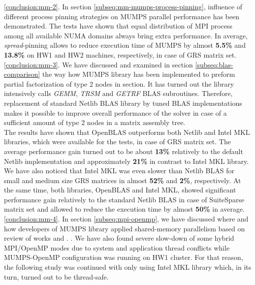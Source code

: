 \ref{conclusion:mm-2}. In section \ref{subseq:mm-mumps-process-pinning}, influence of different process pinning strategies on MUMPS parallel performance has been demonstrated. The tests have shown that equal distribution of MPI process among all available NUMA domains always bring extra performance. In average, \textit{spread}-pinning allows to reduce execution time of MUMPS by almost \textbf{5.5\%} and \textbf{13.8\%} on HW1 and HW2 machines, respectively, in case of GRS matrix set.\\


\ref{conclusion:mm-3}. 
We have discussed and examined in section \ref{subseq:blas-comparison} the way how MUMPS library has been implemented to preform partial factorization of type 2 nodes in section. It has turned out the library intensively calls \textit{GEMM}, \textit{TRSM} and \textit{GETRF} BLAS subroutines. Therefore, replacement of standard Netlib BLAS library by tuned BLAS implementations makes it possible to improve overall performance of the solver in case of a sufficient amount of type 2 nodes in a matrix assembly tree.\\


The results have shown that OpenBLAS outperforms both Netlib and Intel MKL libraries, which were available for the tests, in case of GRS matrix set. The average performance gain turned out to be about \textbf{13\%} relatively to the default Netlib implementation and approximately \textbf{21\%} in contrast to Intel MKL library. We have also noticed that Intel MKL was even slower than Netlib BLAS for small and medium size GRS matrices in almost \textbf{52\%} and \textbf{2\%}, respectively. At the same time, both libraries, OpenBLAS and Intel MKL, showed significant performance gain relatively to the standard Netlib BLAS in case of SuiteSparse matrix set and allowed to reduce the execution time by almost \textbf{50\%} in average. \\


\ref{conclusion:mm-4}. In section \ref{subseq:mpi-openmp}, we have discussed where and how developers of MUMPS library applied shared-memory parallelism based on review of works \cite{chowdhury2010some} and \cite{l2013introduction}.  . We have also found severe slow-down of some hybrid MPI/OpenMP modes due to system and application thread conflicts  while MUMPS-OpenMP configuration was running on HW1 cluster. For that reason, the following study was continued with only using Intel MKL library which, in its turn, turned out to be thread-safe.\\


